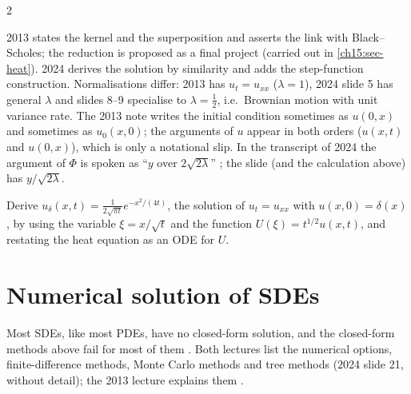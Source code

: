 \begin{paracol}{2}
\begin{remark}
\end{remark}
\begin{coursenote}
2013 states the kernel and the superposition and asserts the link with Black--Scholes; the reduction is proposed as a final project  (carried out in \cref{ch15:sec-heat}). 2024 derives the solution by similarity and adds the step-function construction. Normalisations differ: 2013 has $u_t=u_{xx}$ ($\lambda=1$), 2024 slide 5 has general $\lambda$ and slides 8--9 specialise to $\lambda=\tfrac12$, i.e.\ Brownian motion with unit variance rate. The 2013 note writes the initial condition sometimes as $u(0,x)$ and sometimes as $u_0(x,0)$; the arguments of $u$ appear in both orders ($u(x,t)$ and $u(0,x)$), which is only a notational slip. In the transcript of 2024 the argument of $\Phi$ is spoken as ``$y$ over $2\sqrt{2\lambda}$'' ; the slide (and the calculation above) has $y/\sqrt{2\lambda}$.
\end{coursenote}

\begin{exercise}\label{ch18:ex-32}
Derive $u_\delta(x,t)=\frac1{2\sqrt{\pi t}}e^{-x^2/(4t)}$, the solution of $u_t=u_{xx}$ with $u(x,0)=\delta(x)$, by using the variable $\xi=x/\sqrt t$ and the function $U(\xi)=t^{1/2}u(x,t)$, and restating the heat equation as an ODE for $U$.
\end{exercise}

\section{Numerical solution of SDEs}\label{ch18:sec-num}

Most SDEs, like most PDEs, have no closed-form solution, and the closed-form methods above fail for most of them . Both lectures list the numerical options, finite-difference methods, Monte Carlo methods and tree methods (2024 slide 21, without detail); the 2013 lecture explains them .


\end{paracol}
